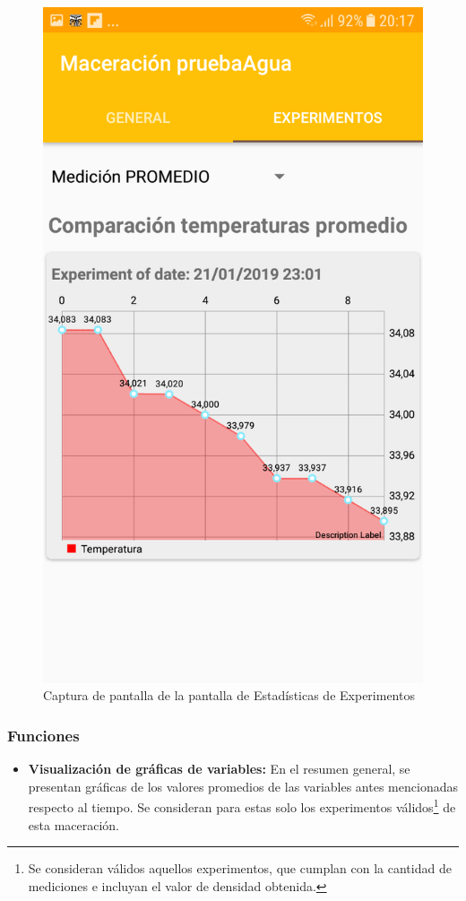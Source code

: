             \begin{figure}[h]
                \centering
                \includegraphics[scale=0.2]{software/ScreenCapture/ExperimentStatistics.jpg}
                \caption{Captura de pantalla de la pantalla de Estadísticas de Experimentos}
                \label{fig:CapturaExpFrag}
            \end{figure}
            \subsubsection{Funciones}
            \begin{itemize}
                \item \textbf{Visualización de gráficas de variables:} En el resumen general, se presentan gráficas de los valores promedios de las variables antes mencionadas respecto al tiempo. Se consideran para estas solo los experimentos válidos\footnote{Se consideran válidos aquellos experimentos, que cumplan con la cantidad de mediciones e incluyan el valor de densidad obtenida.} de esta maceración.
            \end{itemize}
            
